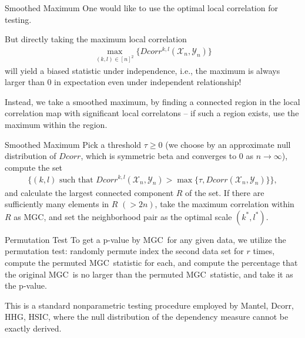 \documentclass[mathserif,t]{beamer}
\newcommand{\Mgc}{MGC}
\begin{document}
\begin{frame}{Smoothed Maximum}
One would like to use the optimal local correlation for testing.\\
\pause
\medskip

But directly taking the maximum local correlation 
\begin{align*}
\max_{(k,l) \in [n]^2}\{Dcorr^{k,l}(\mathcal{X}_{n},\mathcal{Y}_{n})\}
\end{align*}
will yield a biased statistic under independence, i.e., the maximum is always larger than $0$ in expectation even under independent relationship!

\pause
\medskip
Instead, we take a smoothed maximum, by finding a connected region in the local correlation map with significant local correlatons -- if such a region exists, use the maximum within the region.
\end{frame}

\begin{frame}{Smoothed Maximum}
Pick a threshold $\tau \geq 0$ (we choose by an approximate null distribution of $Dcorr$, which is symmetric beta and converges to $0$ as $n \rightarrow \infty$), compute the set
\begin{align*}
\{(k,l) \mbox{ such that } Dcorr^{k,l}(\mathcal{X}_{n},\mathcal{Y}_{n})>\max\{\tau, Dcorr(\mathcal{X}_{n},\mathcal{Y}_{n})\} \},
\end{align*}
\pause
and calculate the largest connected component $R$ of the set.
\pause
If there are sufficiently many elements in $R$ $(>2n)$, take the maximum correlation within $R$ as \Mgc, 
\pause
and set the neighborhood pair as the optimal scale $(k^*,l^*)$.
\end{frame}

\begin{frame}{Permutation Test}
To get a p-value by \Mgc~for any given data, we utilize the permutation test: randomly permute index the second data set for $r$ times, compute the permuted \Mgc~statistic for each, and compute the percentage that the original \Mgc~is no larger than the permuted \Mgc~statistic, and take it as the p-value.
\pause
\medskip

This is a standard nonparametric testing procedure employed by Mantel, Dcorr, HHG, HSIC, where the null distribution of the dependency measure cannot be exactly derived.
\end{frame}
\end{document}
